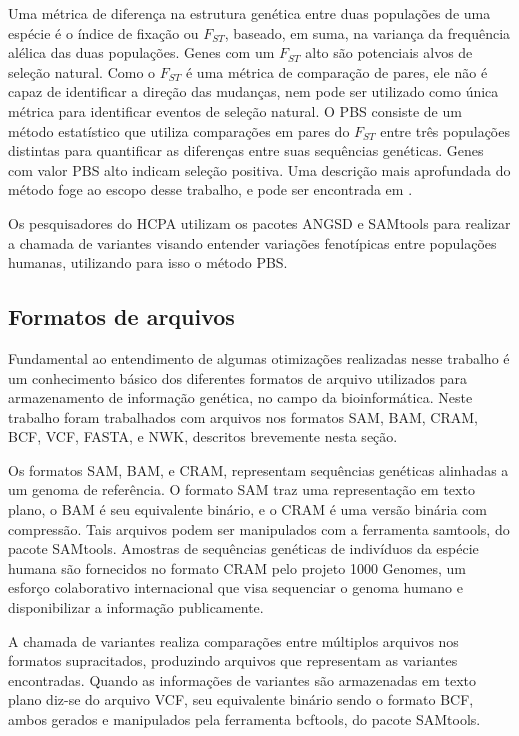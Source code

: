 \documentclass[cic,tc]{iiufrgs}
\begin{document}
Uma métrica de diferença na estrutura genética entre duas populações de uma
espécie é o índice de fixação ou $F_{ST}$, baseado, em suma, na variança da
frequência alélica das duas populações. Genes com um $F_{ST}$ alto são
potenciais alvos de seleção natural.\cite{yi2010sequencing} Como o $F_{ST}$ é
uma métrica de comparação de pares, ele não é capaz de identificar a direção
das mudanças, nem pode ser utilizado como única métrica para identificar
eventos de seleção natural. O PBS consiste de um método estatístico que
utiliza comparações em pares do $F_{ST}$ entre três populações distintas para
quantificar as diferenças entre suas sequências genéticas. Genes com valor
PBS alto indicam seleção positiva.\cite{jiang2019population} Uma descrição
mais aprofundada do método foge ao escopo desse trabalho, e pode ser
encontrada em \cite{yi2010sequencing}.

Os pesquisadores do HCPA utilizam os pacotes ANGSD e SAMtools para realizar
a chamada de variantes visando entender variações fenotípicas entre populações
humanas, utilizando para isso o método PBS.

\subsection{Formatos de arquivos}
\label{sec:formats}

Fundamental ao entendimento de algumas otimizações realizadas nesse trabalho é
um conhecimento básico dos diferentes formatos de arquivo utilizados para
armazenamento de informação genética, no campo da bioinformática. Neste
trabalho foram trabalhados com arquivos nos formatos SAM, BAM, CRAM, BCF, VCF,
FASTA, e NWK, descritos brevemente nesta seção.

Os formatos SAM, BAM, e CRAM, representam sequências genéticas alinhadas a um
genoma de referência. O formato SAM traz uma representação em texto plano, o
BAM é seu equivalente binário, e o CRAM é uma versão binária com compressão.
Tais arquivos podem ser manipulados com a ferramenta samtools, do pacote
SAMtools.\cite{danecek2021twelve} Amostras de sequências genéticas de
indivíduos da espécie humana são fornecidos no formato CRAM pelo projeto 1000
Genomes, um esforço colaborativo internacional que visa sequenciar o genoma
humano e disponibilizar a informação publicamente.\cite{via20101000}

A chamada de variantes realiza comparações entre múltiplos arquivos nos
formatos supracitados, produzindo arquivos que representam as variantes
encontradas. Quando as informações de variantes são armazenadas em texto plano
diz-se do arquivo VCF, seu equivalente binário sendo o formato BCF, ambos
gerados e manipulados pela ferramenta bcftools, do pacote
SAMtools.\cite{danecek2021twelve}
\end{document}

